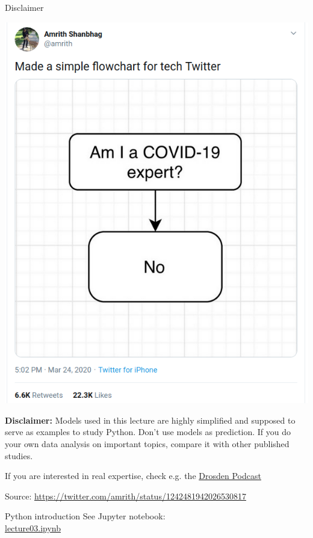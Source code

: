 \begin{frame}[fragile]{Disclaimer}
	\begin{center}
		\includegraphics[height=0.6\textheight]{covid-19-expert.png}
	\end{center}
	
	\pause
	\textbf{Disclaimer:} Models used in this lecture are highly simplified and supposed to serve as examples
	to study Python. Don't use models as prediction. If you do your own data analysis on important
	topics, compare it with other published studies.
	
	If you are interested in real expertise, check e.g. the \href{https://www.ndr.de/nachrichten/info/Corona-Podcast-Alle-Folgen-in-der-Uebersicht,podcastcoronavirus134.html}{Drosden Podcast}
	
	
	{\tiny Source: \href{https://twitter.com/amrith/status/1242481942026530817}{https://twitter.com/amrith/status/1242481942026530817}}
\end{frame}

\begin{frame}[fragile]{Python introduction}
    See Jupyter notebook:\\
    \href{https://github.com/inwe-boku/lecture-scientific-computing/blob/master/lecture03-python-introduction/lecture03.ipynb}{lecture03.ipynb}
\end{frame}


